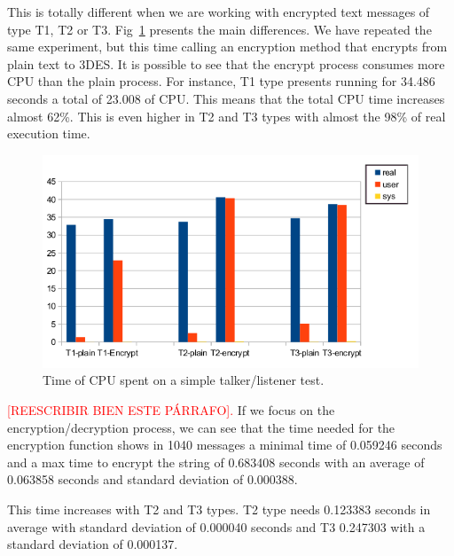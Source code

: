 \documentclass[journal,twoside]{JoPhA}
\begin{document}
This is totally different when we are working with encrypted text messages of type T1, T2 or T3. Fig~\ref{fig:time_text_CPU} presents the main differences. We have repeated the same experiment, but this time calling an encryption method that encrypts from plain text to 3DES. It is possible to see that the encrypt process consumes more CPU than  the plain process.
For instance, T1 type presents running for 34.486 seconds a total of 23.008 of CPU. This means that the total CPU time increases almost 62\%. This is even higher in T2 and T3 types with almost the 98\% of real execution time.
\begin{figure}[ht!]
    \centering
    \includegraphics[width=.5\textwidth]{Tiempos_CPU_cifrado_texto.png}
    \caption{Time of CPU spent on a simple talker/listener test.}
  \label{fig:time_text_CPU}
\end{figure}

\textcolor{red}{[REESCRIBIR BIEN ESTE P\'ARRAFO].} If we focus on the encryption/decryption process, we can see that the time needed for the encryption function shows in 1040 messages a minimal time of 0.059246 seconds and a max time to encrypt the string of 0.683408 seconds with an average of 0.063858 seconds and standard deviation of 0.000388.

This time increases with T2 and T3 types. T2 type needs 0.123383 seconds in average with standard deviation of 0.000040 seconds and  T3  0.247303 with a standard deviation of 0.000137.



\end{document}
